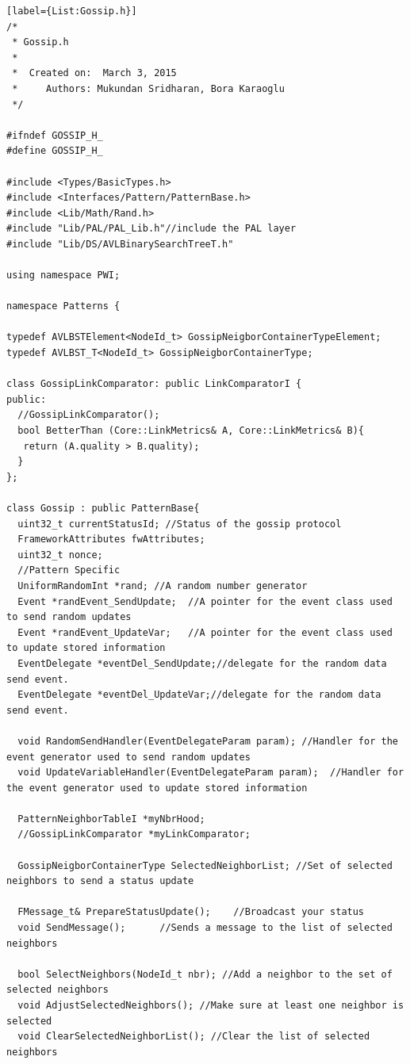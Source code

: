 \begin{lstlisting}[style=boralargefile][label={List:Gossip.h}]
/*
 * Gossip.h
 *
 *  Created on:  March 3, 2015
 *     Authors: Mukundan Sridharan, Bora Karaoglu
 */

#ifndef GOSSIP_H_
#define GOSSIP_H_

#include <Types/BasicTypes.h>
#include <Interfaces/Pattern/PatternBase.h>
#include <Lib/Math/Rand.h>
#include "Lib/PAL/PAL_Lib.h"//include the PAL layer
#include "Lib/DS/AVLBinarySearchTreeT.h"

using namespace PWI;

namespace Patterns {

typedef AVLBSTElement<NodeId_t> GossipNeigborContainerTypeElement;
typedef AVLBST_T<NodeId_t> GossipNeigborContainerType;

class GossipLinkComparator: public LinkComparatorI {
public:
  //GossipLinkComparator();
  bool BetterThan (Core::LinkMetrics& A, Core::LinkMetrics& B){
   return (A.quality > B.quality);
  }
};

class Gossip : public PatternBase{
  uint32_t currentStatusId; //Status of the gossip protocol
  FrameworkAttributes fwAttributes;
  uint32_t nonce;
  //Pattern Specific
  UniformRandomInt *rand; //A random number generator
  Event *randEvent_SendUpdate;	//A pointer for the event class used to send random updates
  Event *randEvent_UpdateVar;	//A pointer for the event class used to update stored information
  EventDelegate *eventDel_SendUpdate;//delegate for the random data send event.
  EventDelegate *eventDel_UpdateVar;//delegate for the random data send event.

  void RandomSendHandler(EventDelegateParam param); //Handler for the event generator used to send random updates
  void UpdateVariableHandler(EventDelegateParam param);  //Handler for the event generator used to update stored information

  PatternNeighborTableI *myNbrHood;
  //GossipLinkComparator *myLinkComparator;

  GossipNeigborContainerType SelectedNeighborList; //Set of selected neighbors to send a status update

  FMessage_t& PrepareStatusUpdate();	//Broadcast your status
  void SendMessage();      //Sends a message to the list of selected neighbors
  
  bool SelectNeighbors(NodeId_t nbr); //Add a neighbor to the set of selected neighbors
  void AdjustSelectedNeighbors(); //Make sure at least one neighbor is selected
  void ClearSelectedNeighborList(); //Clear the list of selected neighbors


\end{lstlisting}
